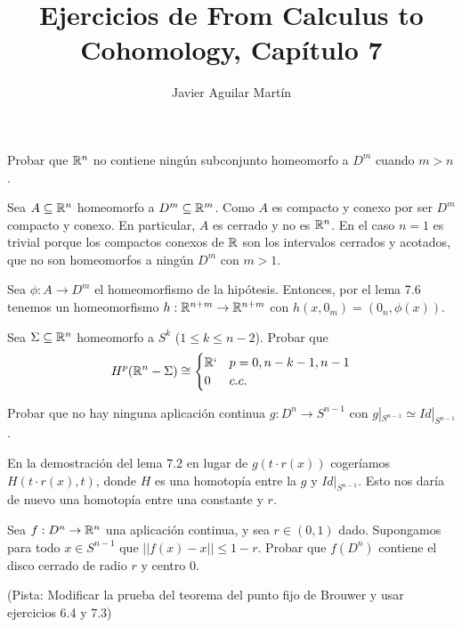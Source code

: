 \documentclass[twoside]{article}
\begin{document}
\title{Ejercicios de From Calculus to Cohomology, Capítulo 7}
\author{Javier Aguilar Martín}
\maketitle


\begin{ejercicio}{7.1}
 Probar que $\mathbb{R}^n$ no contiene ningún subconjunto homeomorfo a $D^m$ cuando $m>n$.
\end{ejercicio}
\begin{solucion}
Sea $A\subseteq \mathbb{R}^n$ homeomorfo a $D^m\subseteq\mathbb{R}^m$. Como $A$ es compacto y conexo por ser $D^m$ compacto y conexo. En particular, $A$ es cerrado y no es $\mathbb{R}^n$. En el caso $n=1$ es trivial porque los compactos conexos de $\mathbb{R}$ son los intervalos cerrados y acotados, que no son homeomorfos a ningún $D^m$ con $m>1$.

Sea $\phi:A\to D^m$ el homeomorfismo de la hipótesis. Entonces, por el lema 7.6 tenemos un homeomorfismo $h:\mathbb{R}^{n+m}\to\mathbb{R}^{n+m}$ con $h(x,0_m)=(0_n,\phi(x))$. 


\end{solucion}

\newpage

\begin{ejercicio}{7.2}
Sea $\Sigma\subseteq\mathbb{R}^n$ homeomorfo a $S^k$ ($1\leq k\leq n-2$). Probar que
\[
H^p(\mathbb{R}^n-\Sigma)\cong\begin{cases}
\mathbb{R}`& p=0,n-k-1,n-1\\
0 & c.c.
\end{cases}
\]
\end{ejercicio}
\begin{solucion}

\end{solucion}
\newpage

\begin{ejercicio}{7.3}
Probar que no hay ninguna aplicación continua $g:D^n\to S^{n-1}$ con $g|_{S^{n-1}}\simeq Id|_{S^{n-1}}$.
\end{ejercicio}
\begin{solucion}
En la demostración del lema 7.2 en lugar de $g(t\cdot r(x))$ cogeríamos $H(t\cdot r(x), t)$, donde $H$ es una homotopía entre la $g$ y $Id|_{S^{n-1}}$. Esto nos daría de nuevo una homotopía entre una constante y $r$.
\end{solucion}
\newpage

\begin{ejercicio}{7.4}
Sea $f:D^n\to\mathbb{R}^n$ una aplicación continua, y sea $r\in(0,1)$ dado. Supongamos para todo $x\in S^{n-1}$ que $||f(x)-x||\leq 1-r$. Probar que $f(D^n)$ contiene el disco cerrado de radio $r$ y centro 0.

(Pista: Modificar la prueba del teorema del punto fijo de Brouwer y usar ejercicios 6.4 y 7.3)
\end{ejercicio}
\begin{solucion}

\end{solucion}
\end{document}
